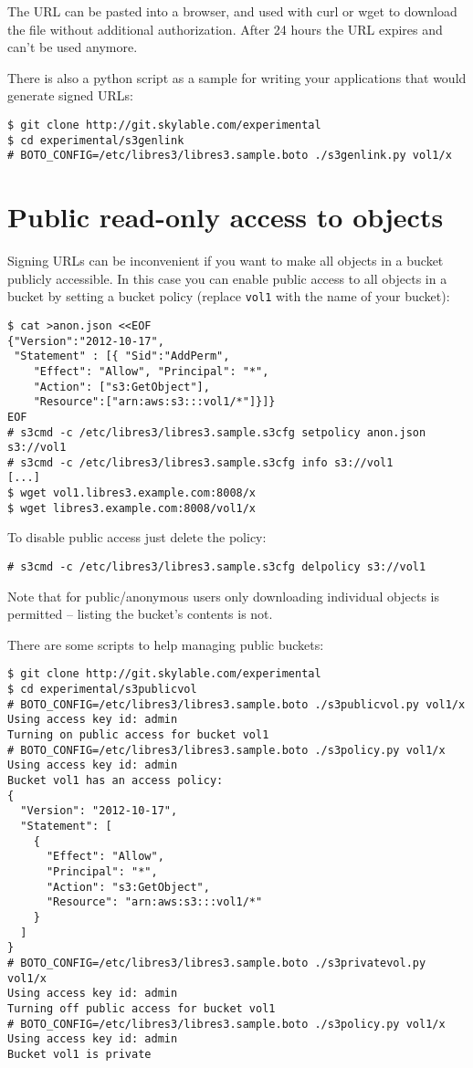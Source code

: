 The URL can be pasted into a browser, and used with curl or wget to download the file without additional authorization. After 24 hours the URL expires and can't be used anymore.

There is also a python script as a sample for writing your applications that
would generate signed URLs:
\begin{lstlisting}
$ git clone http://git.skylable.com/experimental
$ cd experimental/s3genlink
# BOTO_CONFIG=/etc/libres3/libres3.sample.boto ./s3genlink.py vol1/x
\end{lstlisting}

\section{Public read-only access to objects}

Signing URLs can be inconvenient if you want to make all objects in a bucket
publicly accessible.
In this case you can enable public access to all objects in a bucket by setting
a bucket policy (replace \verb|vol1| with the name of your bucket):
\begin{lstlisting}
$ cat >anon.json <<EOF
{"Version":"2012-10-17",
 "Statement" : [{ "Sid":"AddPerm",
    "Effect": "Allow", "Principal": "*",
    "Action": ["s3:GetObject"],
    "Resource":["arn:aws:s3:::vol1/*"]}]}
EOF
# s3cmd -c /etc/libres3/libres3.sample.s3cfg setpolicy anon.json s3://vol1
# s3cmd -c /etc/libres3/libres3.sample.s3cfg info s3://vol1
[...]
$ wget vol1.libres3.example.com:8008/x
$ wget libres3.example.com:8008/vol1/x
\end{lstlisting}

To disable public access just delete the policy:

\begin{lstlisting}
# s3cmd -c /etc/libres3/libres3.sample.s3cfg delpolicy s3://vol1
\end{lstlisting}

Note that for public/anonymous users only downloading individual objects is
permitted -- listing the bucket's contents is not.

There are some scripts to help managing public buckets:
\begin{lstlisting}
$ git clone http://git.skylable.com/experimental
$ cd experimental/s3publicvol
# BOTO_CONFIG=/etc/libres3/libres3.sample.boto ./s3publicvol.py vol1/x
Using access key id: admin
Turning on public access for bucket vol1
# BOTO_CONFIG=/etc/libres3/libres3.sample.boto ./s3policy.py vol1/x
Using access key id: admin
Bucket vol1 has an access policy:
{
  "Version": "2012-10-17",
  "Statement": [
    {
      "Effect": "Allow",
      "Principal": "*",
      "Action": "s3:GetObject",
      "Resource": "arn:aws:s3:::vol1/*"
    }
  ]
}
# BOTO_CONFIG=/etc/libres3/libres3.sample.boto ./s3privatevol.py vol1/x
Using access key id: admin
Turning off public access for bucket vol1
# BOTO_CONFIG=/etc/libres3/libres3.sample.boto ./s3policy.py vol1/x
Using access key id: admin
Bucket vol1 is private
\end{lstlisting}

